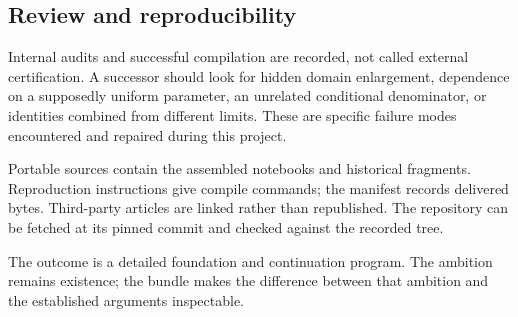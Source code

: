 \documentclass[11pt]{article}
\theoremstyle{remark}
\begin{document}
\subsection{Review and reproducibility}

Internal audits and successful compilation
are recorded, not called external
certification. A successor should look for
hidden domain enlargement, dependence on a
supposedly uniform parameter, an unrelated
conditional denominator, or identities
combined from different limits. These are
specific failure modes encountered and
repaired during this project.

Portable sources contain the assembled
notebooks and historical fragments.
Reproduction instructions give compile
commands; the manifest records delivered
bytes. Third-party articles are linked
rather than republished. The repository
can be fetched at its pinned commit and
checked against the recorded tree.

The outcome is a detailed foundation and
continuation program. The ambition remains
existence; the bundle makes the difference
between that ambition and the established
arguments inspectable.
\end{document}
